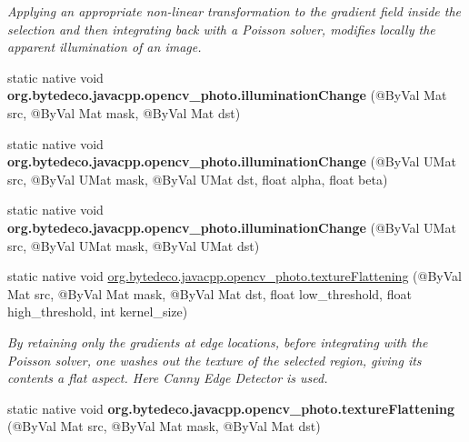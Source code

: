 \begin{DoxyCompactItemize}
\begin{DoxyCompactList}\small\item\em Applying an appropriate non-\/linear transformation to the gradient field inside the selection and then integrating back with a Poisson solver, modifies locally the apparent illumination of an image. \end{DoxyCompactList}\item 
\mbox{\label{group__photo__clone_gab3e52ed0c9f389ac9a17955a2cbff3b6}} 
static native void {\bfseries org.\+bytedeco.\+javacpp.\+opencv\+\_\+photo.\+illumination\+Change} (@By\+Val Mat src, @By\+Val Mat mask, @By\+Val Mat dst)
\item 
\mbox{\label{group__photo__clone_ga09b1569af074d9111f0b13c03da3f5dd}} 
static native void {\bfseries org.\+bytedeco.\+javacpp.\+opencv\+\_\+photo.\+illumination\+Change} (@By\+Val U\+Mat src, @By\+Val U\+Mat mask, @By\+Val U\+Mat dst, float alpha, float beta)
\item 
\mbox{\label{group__photo__clone_ga3923642ffb0eae09d7d9926c8b91dbed}} 
static native void {\bfseries org.\+bytedeco.\+javacpp.\+opencv\+\_\+photo.\+illumination\+Change} (@By\+Val U\+Mat src, @By\+Val U\+Mat mask, @By\+Val U\+Mat dst)
\item 
static native void \hyperlink{group__photo__clone_ga8d42433222e7742e59e275e148c3d4a5}{org.\+bytedeco.\+javacpp.\+opencv\+\_\+photo.\+texture\+Flattening} (@By\+Val Mat src, @By\+Val Mat mask, @By\+Val Mat dst, float low\+\_\+threshold, float high\+\_\+threshold, int kernel\+\_\+size)
\begin{DoxyCompactList}\small\item\em By retaining only the gradients at edge locations, before integrating with the Poisson solver, one washes out the texture of the selected region, giving its contents a flat aspect. Here Canny Edge Detector is used. \end{DoxyCompactList}\item 
\mbox{\label{group__photo__clone_gac122bd4168012e6d0c3fc44d3fa71811}} 
static native void {\bfseries org.\+bytedeco.\+javacpp.\+opencv\+\_\+photo.\+texture\+Flattening} (@By\+Val Mat src, @By\+Val Mat mask, @By\+Val Mat dst)
\item 
\mbox{\label{group__photo__clone_gacf724a2ceb10e438d8944e43f003bba6}} 

\end{DoxyCompactItemize}
